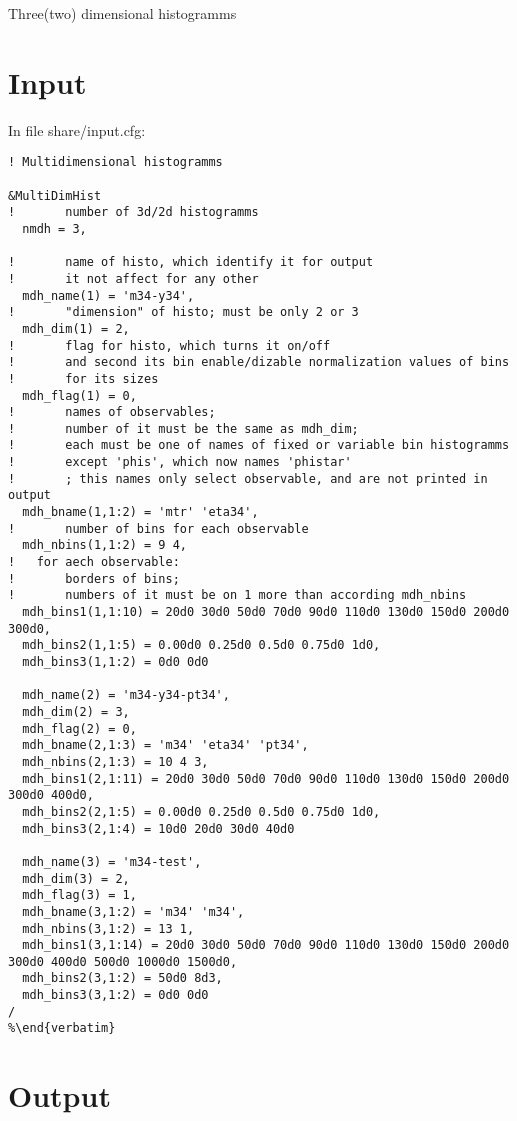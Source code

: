 \documentclass{article}
\begin{document}
\begin{center}
\Large{Three(two) dimensional histogramms}
\end{center}

\section{Input}

\lstset{language=Fortran}
In file share/input.cfg:

\begin{lstlisting}
! Multidimensional histogramms

&MultiDimHist
!		number of 3d/2d histogramms
  nmdh = 3,	
  
!		name of histo, which identify it for output
!		it not affect for any other
  mdh_name(1) = 'm34-y34',
!		"dimension" of histo; must be only 2 or 3
  mdh_dim(1) = 2,
!		flag for histo, which turns it on/off
!		and second its bin enable/dizable normalization values of bins
!		for its sizes
  mdh_flag(1) = 0,
!		names of observables;
!		number of it must be the same as mdh_dim;
!		each must be one of names of fixed or variable bin histogramms
!		except 'phis', which now names 'phistar'
!		; this names only select observable, and are not printed in output
  mdh_bname(1,1:2) = 'mtr' 'eta34',
!		number of bins for each observable
  mdh_nbins(1,1:2) = 9 4,
!	for aech observable:
!		borders of bins;
!		numbers of it must be on 1 more than according mdh_nbins
  mdh_bins1(1,1:10) = 20d0 30d0 50d0 70d0 90d0 110d0 130d0 150d0 200d0 300d0,
  mdh_bins2(1,1:5) = 0.00d0 0.25d0 0.5d0 0.75d0 1d0,
  mdh_bins3(1,1:2) = 0d0 0d0

  mdh_name(2) = 'm34-y34-pt34',
  mdh_dim(2) = 3,
  mdh_flag(2) = 0,
  mdh_bname(2,1:3) = 'm34' 'eta34' 'pt34',
  mdh_nbins(2,1:3) = 10 4 3,
  mdh_bins1(2,1:11) = 20d0 30d0 50d0 70d0 90d0 110d0 130d0 150d0 200d0 300d0 400d0,
  mdh_bins2(2,1:5) = 0.00d0 0.25d0 0.5d0 0.75d0 1d0,
  mdh_bins3(2,1:4) = 10d0 20d0 30d0 40d0

  mdh_name(3) = 'm34-test',
  mdh_dim(3) = 2,
  mdh_flag(3) = 1,
  mdh_bname(3,1:2) = 'm34' 'm34',
  mdh_nbins(3,1:2) = 13 1,
  mdh_bins1(3,1:14) = 20d0 30d0 50d0 70d0 90d0 110d0 130d0 150d0 200d0 300d0 400d0 500d0 1000d0 1500d0,
  mdh_bins2(3,1:2) = 50d0 8d3,
  mdh_bins3(3,1:2) = 0d0 0d0
/
%\end{verbatim}
\end{lstlisting}

\section{Output}
\end{document}
